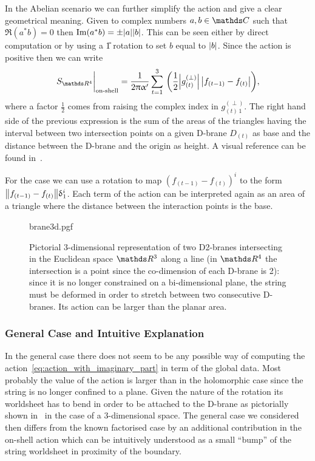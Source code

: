 In the Abelian scenario we can further simplify the action and give a clear geometrical meaning.
Given to complex numbers $a, b \in \C$ such that $\Re(a^* b)=0$ then $\Im(a^* b) = \pm \abs{a} \abs{b}$.
This can be seen either by direct computation or by using a \U{1} rotation to set $b$ equal to $\abs{b}$.
Since the action is positive then we can write
\begin{equation}
  \eval{S_{\R^4}}_{\text{on-shell}}
  =
  \frac{1}{2 \pi \ap}
  \finitesum{t}{1}{3}\,
  \qty(
    \frac{1}{2} \abs{g^{(\perp)}_{(t)}} \,
    \abs{f_{(t-1)} - f_{(t)}}
  ),
\end{equation}
where a factor $\frac{1}{2}$ comes from raising the complex index in $g^{(\perp)}_{(t)\, 1}$.
The right hand side of the previous expression is the sum of the areas of the triangles having the interval between two intersection points on a given D-brane $D_{(t)}$ as base and the distance between the D-brane and the origin as height.
A visual reference can be found in~.

For the  case we can use a rotation to map $(f_{(t-1)} - f_{(t)})^i$ to the form $\norm{f_{(t-1)} - f_{(t)}} \updelta^i_1$.
Each term of the action can be interpreted again as an area of a triangle where the distance between the interaction points is the base.

\begin{figure}[tbp]
  \centering
  {brane3d.pgf}
  \caption{%
    Pictorial $3$-dimensional representation of two D2-branes intersecting in the Euclidean space $\R^3$ along a line (in $\R^4$ the intersection is a point since the co-dimension of each D-brane is 2): since it is no longer constrained on a bi-dimensional plane, the string must be deformed in order to stretch between two consecutive D-branes.
    Its action can be larger than the planar area.
  }
  \label{fig:brane3d}
\end{figure}

\subsubsection{General Case and Intuitive Explanation}

In the general case there does not seem to be any possible way of computing the action~\eqref{eq:action_with_imaginary_part} in term of the global data.
Most probably the value of the action is larger than in the holomorphic case since the string is no longer confined to a plane.
Given the nature of the rotation its worldsheet has to bend in order to be attached to the D-brane as pictorially shown in~ in the case of a $3$-dimensional space.
The general case we considered then differs from the known factorised case by an additional contribution in the on-shell action which can be intuitively understood as a small ``bump'' of the string worldsheet in proximity of the boundary.


